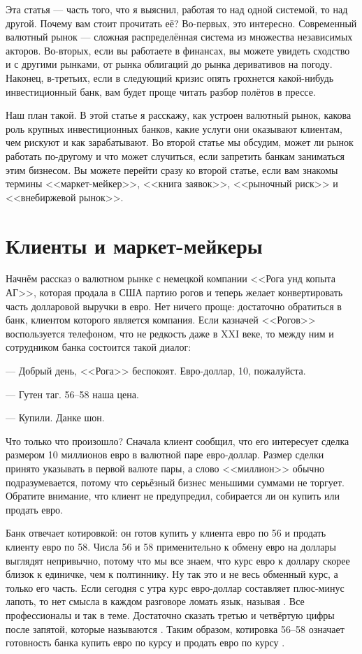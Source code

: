 Эта статья --- часть того, что я выяснил, работая то над одной системой, то над
другой. Почему вам стоит прочитать её? Во-первых, это интересно. Современный
валютный рынок --- сложная распределённая система из множества независимых
акторов. Во-вторых, если вы работаете в финансах, вы можете увидеть сходство и с
другими рынками, от рынка облигаций до рынка деривативов на погоду. Наконец,
в-третьих, если в следующий кризис опять грохнется какой-нибудь инвестиционный
банк, вам будет проще читать разбор полётов в прессе.

Наш план такой. В этой статье я расскажу, как устроен валютный рынок, какова
роль крупных инвестиционных банков, какие услуги они оказывают клиентам, чем
рискуют и как зарабатывают. Во второй статье мы обсудим, может ли
рынок работать по-другому и что может случиться, если запретить банкам
заниматься этим бизнесом. Вы можете перейти сразу ко второй статье, если вам
знакомы термины <<маркет-мейкер>>, <<книга заявок>>, <<рыночный риск>> и
<<внебиржевой рынок>>.

\section*{Клиенты и маркет-мейкеры}

Начнём рассказ о валютном рынке с немецкой компании <<Рога унд копыта АГ>>,
которая продала в США партию рогов и теперь желает конвертировать часть
долларовой выручки в евро. Нет ничего проще: достаточно обратиться в банк,
клиентом которого является компания. Если казначей <<Рогов>> воспользуется
телефоном, что не редкость даже в \RN{21} веке, то между ним и сотрудником банка
состоится такой диалог:

 --- Добрый день, <<Рога>> беспокоят. Евро-доллар, 10, пожалуйста.

 --- Гутен таг. 56--58 наша цена.

 --- Купили. Данке шон.

Что только что произошло? Сначала клиент сообщил, что его интересует сделка
размером 10 миллионов евро в валютной паре евро-доллар. Размер сделки принято
указывать в первой валюте пары, а слово <<миллион>> обычно подразумевается,
потому что серьёзный бизнес меньшими суммами не торгует. Обратите внимание, что
клиент не предупредил, собирается ли он купить или продать евро.

Банк отвечает  котировкой: он готов купить у
клиента евро по 56 и продать клиенту евро по 58. Числа 56 и 58 применительно к
обмену евро на доллары выглядят непривычно, потому что мы все знаем, что курс
евро к доллару скорее близок к единичке, чем к полтиннику. Ну так это и не весь
обменный курс, а только его часть. Если сегодня с утра курс евро-доллар
составляет  плюс-минус лапоть, то нет смысла в каждом разговоре
ломать язык, называя  . Все
профессионалы и так в теме. Достаточно сказать третью и четвёртую цифры после
запятой, которые называются . Таким
образом, котировка 56--58 означает готовность банка купить евро по курсу
 и продать евро по курсу .

